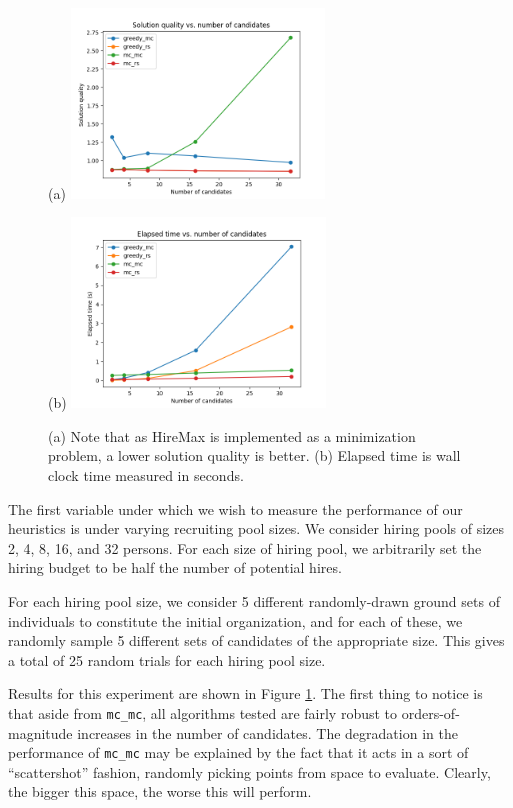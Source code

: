 \begin{figure}[h!]
	\centering
	(a) \includegraphics[width=0.6\textwidth]{figs/num_candidates_multi_ground_set_plot.png}
	
	(b) \includegraphics[width=0.6\textwidth]{figs/num_candidates_multi_ground_set_times_plot.png}
	\caption{(a) Note that as HireMax is implemented as a minimization problem, a lower solution quality is better. (b) Elapsed time is wall clock time measured in seconds.}
	\label{fig:num-candidates}
\end{figure} 

The first variable under which we wish to measure the performance of our heuristics is under varying recruiting pool sizes.
We consider hiring pools of sizes 2, 4, 8, 16, and 32 persons.
For each size of hiring pool, we arbitrarily set the hiring budget to be half the number of potential hires.

For each hiring pool size, we consider 5 different randomly-drawn ground sets of individuals to constitute the initial organization, and for each of these, we randomly sample 5 different sets of candidates of the appropriate size.
This gives a total of 25 random trials for each hiring pool size.

Results for this experiment are shown in Figure \ref{fig:num-candidates}.
The first thing to notice is that aside from \texttt{mc\_mc}, all algorithms tested are fairly robust to orders-of-magnitude increases in the number of candidates.
The degradation in the performance of \texttt{mc\_mc} may be explained by the fact that it acts in a sort of ``scattershot'' fashion, randomly picking points from space to evaluate.
Clearly, the bigger this space, the worse this will perform.

